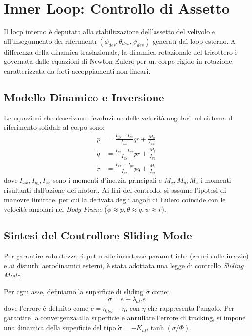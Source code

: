 \clearpage

\section{Inner Loop: Controllo di Assetto}
Il loop interno è deputato alla stabilizzazione dell'assetto del velivolo e all'inseguimento dei riferimenti $(\phi_{des}, \theta_{des}, \psi_{des})$ generati dal loop esterno. A differenza della dinamica traslazionale, la dinamica rotazionale del tricottero è governata dalle equazioni di Newton-Eulero per un corpo rigido in rotazione, caratterizzata da forti accoppiamenti non lineari.

\subsection{Modello Dinamico e Inversione}
Le equazioni che descrivono l'evoluzione delle velocità angolari nel sistema di riferimento solidale al corpo sono:
\begin{align}
    \dot{p} &= \frac{I_{yy} - I_{zz}}{I_{xx}} qr + \frac{M_x}{I_{xx}} \\
    \dot{q} &= \frac{I_{zz} - I_{xx}}{I_{yy}} pr + \frac{M_y}{I_{yy}} \\
    \dot{r} &= \frac{I_{xx} - I_{yy}}{I_{zz}} pq + \frac{M_z}{I_{zz}}
\end{align}
dove $I_{xx}, I_{yy}, I_{zz}$ sono i momenti d'inerzia principali e $M_x, M_y, M_z$ i momenti risultanti dall'azione dei motori. Ai fini del controllo, si assume l'ipotesi di manovre limitate, per cui la derivata degli angoli di Eulero coincide con le velocità angolari nel \textit{Body Frame} ($\dot{\phi} \approx p, \dot{\theta} \approx q, \dot{\psi} \approx r$).

\subsection{Sintesi del Controllore Sliding Mode}
Per garantire robustezza rispetto alle incertezze parametriche (errori sulle inerzie) e ai disturbi aerodinamici esterni, è stata adottata una legge di controllo \textit{Sliding Mode}.

Per ogni asse, definiamo la superficie di sliding $\sigma$ come:
\begin{equation}
    \sigma = \dot{e} + \lambda_{att} e
\end{equation}
dove l'errore è definito come $e = \eta_{des} - \eta$, con $\eta$ che rappresenta l'angolo. Per garantire la convergenza alla superficie e annullare l'errore di tracking, si impone una dinamica della superficie del tipo $\dot{\sigma} = -K_{att} \tanh(\sigma/\Phi)$. 

